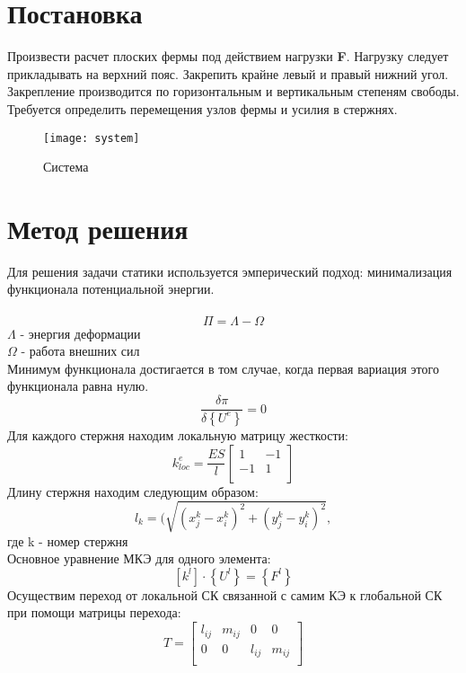 \documentclass[12pt,a4paper]{article}
\begin{document}
	\vfill %
	
	\newpage
	\section{Постановка}
	Произвести расчет плоских фермы под действием нагрузки  \textbf{F}. Нагрузку следует
	прикладывать на верхний пояс. Закрепить крайне левый и правый нижний угол. Закрепление
	производится по горизонтальным и вертикальным степеням свободы. Требуется определить
	перемещения узлов фермы и усилия в стержнях.
	\begin{figure}[H]
		\centering
		\texttt{[image: system]}
		\caption{Система}
		\label{pic1}
	\end{figure}
	\section{Метод решения}
	Для решения задачи статики используется эмперический подход: минимализация функционала потенциальной энергии.\\\\
	\[
	\Pi=\Lambda-\Omega
	\]
	$\Lambda$ - энергия деформации\\	
	$\Omega$ - работа внешних сил\\
	Минимум функционала достигается в том случае, когда первая вариация этого функционала равна нулю.\\
	\[\frac{\delta\pi}{\delta \left\{U^e\right\}}=0\]
	Для каждого стержня находим локальную матрицу жесткости:\\
	\[k_{loc}^e=\frac{ES}{l}\left[\begin{array}{ccc}
		1 & -1 \\
		-1 & 1 \\
	\end{array}\right]\]
	Длину стержня находим следующим образом:
	\[l_k=(\sqrt{(x_j^k-x_i^k)^2+(y_j^k-y_i^k)^2},\] где k - номер стержня\\
	Основное уравнение МКЭ для одного элемента:
	\[\left[k^l\right]\cdot{\left\{U^l\right\}}=\left\{F^l\right\}\]
	Осуществим переход от локальной СК связанной с самим КЭ к глобальной СК при помощи матрицы перехода:
	\begin{equation*}
		T=
		\begin{bmatrix}
			l_{ij} & m_{ij} & 0 & 0 \\
			0 & 0 & l_{ij} & m_{ij} \\
		\end{bmatrix} 
	\end{equation*}
	
\end{document}
